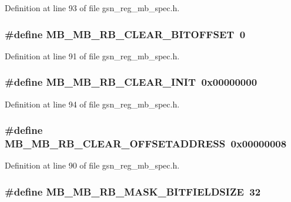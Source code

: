 Definition at line 93 of file gsn\_\-reg\_\-mb\_\-spec.h.

\hypertarget{a00562_abb535dba1828969b23228aa6991ce47d}{
\subsubsection[{MB\_\-MB\_\-RB\_\-CLEAR\_\-BITOFFSET}]{\setlength{\rightskip}{0pt plus 5cm}\#define MB\_\-MB\_\-RB\_\-CLEAR\_\-BITOFFSET~0}}
\label{a00562_abb535dba1828969b23228aa6991ce47d}


Definition at line 91 of file gsn\_\-reg\_\-mb\_\-spec.h.

\hypertarget{a00562_aadc0006d23637e83c4378dc006d4f37f}{
\subsubsection[{MB\_\-MB\_\-RB\_\-CLEAR\_\-INIT}]{\setlength{\rightskip}{0pt plus 5cm}\#define MB\_\-MB\_\-RB\_\-CLEAR\_\-INIT~0x00000000}}
\label{a00562_aadc0006d23637e83c4378dc006d4f37f}


Definition at line 94 of file gsn\_\-reg\_\-mb\_\-spec.h.

\hypertarget{a00562_af6920db3f8dde109c74c9dee03860512}{
\subsubsection[{MB\_\-MB\_\-RB\_\-CLEAR\_\-OFFSETADDRESS}]{\setlength{\rightskip}{0pt plus 5cm}\#define MB\_\-MB\_\-RB\_\-CLEAR\_\-OFFSETADDRESS~0x00000008}}
\label{a00562_af6920db3f8dde109c74c9dee03860512}


Definition at line 90 of file gsn\_\-reg\_\-mb\_\-spec.h.

\hypertarget{a00562_ad1c78fd5c3e9172bb30064042ee2d055}{
\subsubsection[{MB\_\-MB\_\-RB\_\-MASK\_\-BITFIELDSIZE}]{\setlength{\rightskip}{0pt plus 5cm}\#define MB\_\-MB\_\-RB\_\-MASK\_\-BITFIELDSIZE~32}}
\label{a00562_ad1c78fd5c3e9172bb30064042ee2d055}


